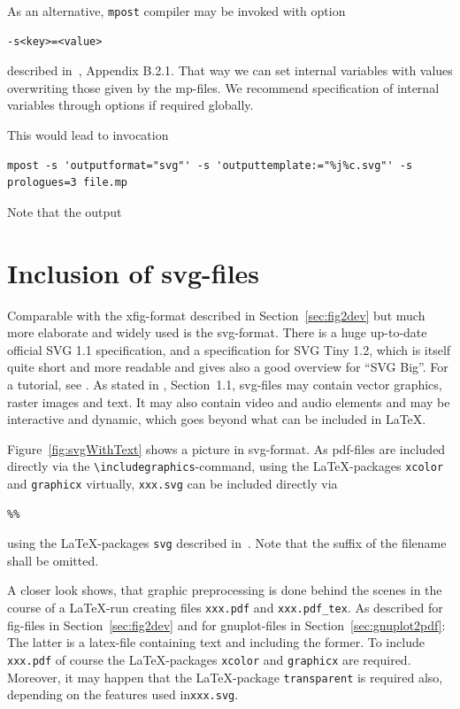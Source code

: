 \documentclass[12pt]{book}
\newcommand{\gls}[1]{#1}
\begin{document}
As an alternative, \texttt{mpost} compiler may be invoked with option 
%
\begin{verbatim}
-s<key>=<value>
\end{verbatim}
%
described in~\cite{MPost}, Appendix B.2.1. 
That way we can set internal variables with values 
overwriting those given by the mp-files. 
We recommend specification of internal variables through options 
if required globally. 

This would lead to invocation 
%
\begin{Verbatim}[fontsize=\scriptsize]
mpost -s 'outputformat="svg"' -s 'outputtemplate:="%j%c.svg"' -s prologues=3 file.mp
\end{Verbatim}

Note that the output 

\section{Inclusion of svg-files}\label{sec:picSvg}

Comparable with the xfig-format described in Section~\ref{sec:fig2dev} 
but much more elaborate and widely used is the \gls{svg}-format. 
There is a huge up-to-date official SVG 1.1 specification, \cite{Svg11} 
and a specification for SVG Tiny 1.2, 
\cite{Svg12Tiny} which is itself quite short and more readable 
and gives also a good overview for ``SVG Big''. 
For a tutorial, see \cite{SvgTut}. 
As stated in \cite{Svg12Tiny}, Section~1.1, 
svg-files may contain vector graphics, raster images and text. 
It may also contain video and audio elements 
and may be interactive and dynamic, 
which goes beyond what can be included in \LaTeX. 

Figure~\ref{fig:svgWithText} shows a picture in \gls{svg}-format. 
As pdf-files are included directly 
via the {\tt\textbackslash includegraphics}-command, 
using the \LaTeX-packages \texttt{xcolor} and \texttt{graphicx} 
virtually, 
\texttt{xxx.svg} can be included directly via 
\begin{verbatim}
%%
\end{verbatim}
%
using the \LaTeX-packages \texttt{svg} described in~\cite{SvgP}. 
Note that the suffix of the filename shall be omitted. 

A closer look shows, that graphic preprocessing is done behind the scenes 
in the course of a \LaTeX-run 
creating files \texttt{xxx.pdf} and \texttt{xxx.pdf\_tex}. 
As described for fig-files in Section~\ref{sec:fig2dev} 
and for gnuplot-files in Section~\ref{sec:gnuplot2pdf}: 
The latter is a latex-file containing text 
and including the former. 
To include \texttt{xxx.pdf} 
of course the \LaTeX-packages \texttt{xcolor} and \texttt{graphicx} 
are required. 
Moreover, it may happen that the \LaTeX-package \texttt{transparent} 
is required also, depending on the features used in\texttt{xxx.svg}. 
\end{document}
